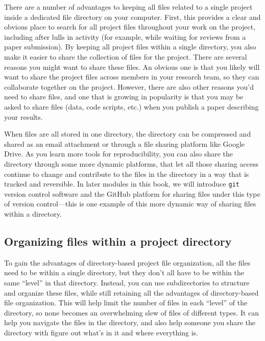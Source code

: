 \documentclass[]{tufte-book}
\begin{document}
There are a number of advantages to keeping all files related to a single project
inside a dedicated file directory on your computer. First, this provides a clear
and obvious place to search for all project files throughout your work on the
project, including after lulls in activity (for example, while waiting for
reviews from a paper submission). By keeping all project files within a single
directory, you also make it easier to share the collection of files for the
project. There are several reasons you might want to share these files. An
obvious one is that you likely will want to share the project files across members
in your research team, so they can collaborate together on the project. However,
there are also other reasons you'd need to share files, and one that is growing
in popularity is that you may be asked to share files (data, code scripts, etc.)
when you publish a paper describing your results.

When files are all stored in one directory, the directory can be compressed and
shared as an email attachment or through a file sharing platform like Google Drive.
As you learn more tools for reproducibility, you can also share the directory through
some more dynamic platforms, that let all those sharing access continue to change
and contribute to the files in the directory in a way that is tracked and
reversible. In later modules in this book, we will introduce \texttt{git} version control
software and the GitHub platform for sharing files under this type of version
control---this is one example of this more dynamic way of sharing files within
a directory.

\hypertarget{organizing-files-within-a-project-directory}{%
\subsection{Organizing files within a project directory}\label{organizing-files-within-a-project-directory}}

To gain the advantages of directory-based project file organization, all the
files need to be within a single directory, but they don't all have to be within
the same ``level'' in that directory. Instead, you can use subdirectories to
structure and organize these files, while still retaining all the advantages of
directory-based file organization. This will help limit the number of files in
each ``level'' of the directory, so none becomes an overwhelming slew of files of
different types. It can help you navigate the files in the directory, and also
help someone you share the directory with figure out what's in it and where
everything is.
\end{document}

